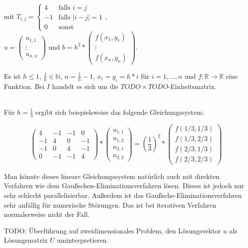 \documentclass{article}
\begin{document}
mit $T_{i,j} = \begin{cases} 4 & \text{falls } i = j \\ -1 & \text{falls } |i-j| = 1 \\ 0 & \text{sonst}\end{cases}, \quad$ 
$u = \begin{pmatrix}
u_{1,1} \\ 
\vdots \\
u_{n,n}
\end{pmatrix} \text{ und } b = h^2 * \begin{pmatrix}
f(x_1, y_1) \\ 
\vdots \\
f(x_n, y_n)
\end{pmatrix}.$

Es ist $h \leq 1$, $\frac{1}{h} \in \mathbb{N}$, $n = \frac{1}{h}-1$, $x_i = y_i = h*i$ für $i = 1, \ldots, n$ und $f : \mathbb{R} \to \mathbb{R}$ eine Funktion. Bei $I$ handelt es sich um die $TODO \times TODO$-Einheitsmatrix.

~\\

Für $h = \frac{1}{3}$ ergibt sich beispielsweise das folgende Gleichungssystem:

$$\begin{pmatrix}
4 & -1 & -1 & 0 \\ 
-1 & 4 & 0 & -1 \\ 
-1 & 0 & 4 & -1 \\ 
0 & -1 & -1 & 4
\end{pmatrix} *
\begin{pmatrix}
u_{1,1} \\ 
u_{1,2} \\ 
u_{2,1} \\ 
u_{2,2}
\end{pmatrix} = \left(\frac{1}{3}\right)^2 *
\begin{pmatrix}
f(1/3,1/3) \\ 
f(1/3,2/3) \\ 
f(2/3,1/3) \\ 
f(2/3,2/3)
\end{pmatrix}
$$

Man könnte dieses lineare Gleichungssystem natürlich auch mit direkten Verfahren wie dem Gaußschen-Eliminationsverfahren lösen. Dieses ist jedoch nur sehr schlecht parallelisierbar. Außerdem ist das Gaußsche-Eliminationsverfahren sehr anfällig für numerische Störungen. Das ist bei iterativen Verfahren normalerweise nicht der Fall.

TODO: Überführung auf zweidimensionales Problem, den Lösungsvektor $u$ als Lösungsmatrix $U$ uminterpretieren.
\end{document}
